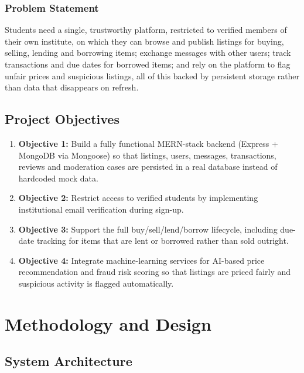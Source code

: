 \documentclass[12pt]{report}
\begin{document}
\subsection{Problem Statement}
Students need a single, trustworthy platform, restricted to verified members of their own
institute, on which they can browse and publish listings for buying, selling, lending and
borrowing items; exchange messages with other users; track transactions and due dates for
borrowed items; and rely on the platform to flag unfair prices and suspicious listings, all
of this backed by persistent storage rather than data that disappears on refresh.

\section{Project Objectives}
\begin{enumerate}[label=\arabic*.]
    \item \textbf{Objective 1:} Build a fully functional MERN-stack backend (Express + MongoDB
    via Mongoose) so that listings, users, messages, transactions, reviews and moderation
    cases are persisted in a real database instead of hardcoded mock data.
    \item \textbf{Objective 2:} Restrict access to verified students by implementing
    institutional email verification during sign-up.
    \item \textbf{Objective 3:} Support the full buy/sell/lend/borrow lifecycle, including
    due-date tracking for items that are lent or borrowed rather than sold outright.
    \item \textbf{Objective 4:} Integrate machine-learning services for AI-based price
    recommendation and fraud risk scoring so that listings are priced fairly and suspicious
    activity is flagged automatically.
\end{enumerate}

\chapter{Methodology and Design}

\section{System Architecture}
\end{document}
